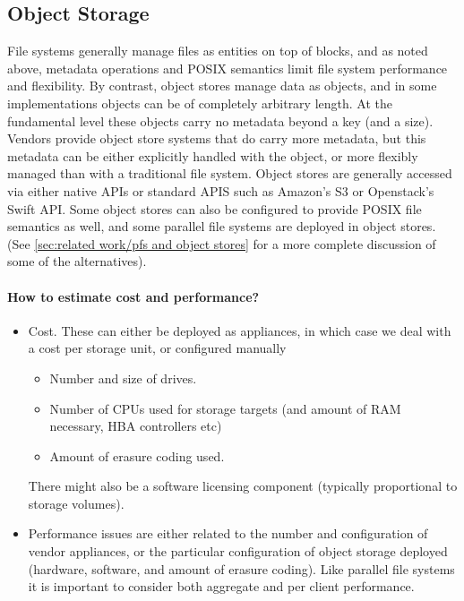 \documentclass{../../template/esiwace-report}
\begin{document}
\subsection{Object Storage}

File systems generally manage files as entities on top of blocks, and as noted above, metadata operations and POSIX semantics limit file system performance and flexibility. By contrast, object stores manage data as objects, and in some implementations objects can be of completely arbitrary length. At the fundamental level  these objects carry no metadata beyond a key (and a size). Vendors provide object store systems that do carry more metadata, but this metadata can be either explicitly handled with the object, or more flexibly managed than with a traditional file system. Object stores are generally accessed via either native APIs or standard APIS such as Amazon's S3 or Openstack's Swift API.  Some object stores can also be configured to provide POSIX file semantics as well, and some parallel file systems are deployed in object stores.  (See \ref{sec:related work/pfs and object stores} for a more complete discussion of some of the alternatives).

\paragraph{How to estimate cost and performance?}
\begin{itemize}
	\item Cost. These can either be deployed as appliances, in which case we deal with a cost per storage unit, or configured manually
	\begin{itemize} \item Number and size of drives.
	\item Number of CPUs used for storage targets (and amount of RAM necessary, HBA controllers etc)
	\item Amount of erasure coding used.
	\end{itemize}
	There might also be a software licensing component (typically proportional to storage volumes).
	\item Performance issues are either related to the number and configuration of vendor appliances, or the particular configuration of object storage deployed (hardware, software, and amount of erasure coding). Like parallel file systems it is important to consider both aggregate and per client performance.
\end{itemize}
\end{document}
